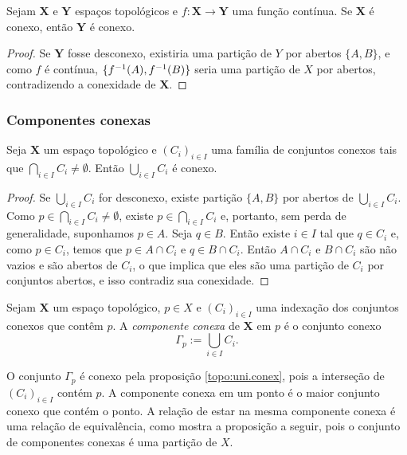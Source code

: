 \begin{proposition}
Sejam $\bm X$ e $\bm Y$ espaços topológicos e $f: \bm X \to \bm Y$ uma função contínua. Se $\bm X$ é conexo, então $\bm Y$ é conexo.
\end{proposition}
\begin{proof}
Se $\bm Y$ fosse desconexo, existiria uma partição de $Y$ por abertos $\{A,B\}$, e como $f$ é contínua, $\{f^{-1}(A),f^{-1}(B)\}$ seria uma partição de $X$ por abertos, contradizendo a conexidade de $\bm X$.
\end{proof}

\subsubsection{Componentes conexas}

\begin{proposition}
\label{topo:uni.conex}
Seja $\bm X$ um espaço topológico e $(C_i)_{i \in I}$ uma família de conjuntos conexos tais que $\bigcap_{i \in I} C_i \neq \emptyset$. Então $\bigcup_{i \in I} C_i$ é conexo.
\end{proposition}
\begin{proof}
Se $\bigcup_{i \in I} C_i$ for desconexo, existe partição $\{A,B\}$ por abertos de $\bigcup_{i \in I} C_i$. Como $p \in \bigcap_{i \in I} C_i \neq \emptyset$, existe $p \in \bigcap_{i \in I} C_i$ e, portanto, sem perda de generalidade, suponhamos $p \in A$. Seja $q \in B$. Então existe $i \in I$ tal que $q \in C_i$ e, como $p \in C_i$, temos que $p \in A \cap C_i$ e $q \in B \cap C_i$. Então $A \cap C_i$ e $B \cap C_i$ são não vazios e são abertos de $C_i$, o que implica que eles são uma partição de $C_i$ por conjuntos abertos, e isso contradiz sua conexidade.
\end{proof}

\begin{definition}
Sejam $\bm X$ um espaço topológico, $p \in X$ e $(C_i)_{i \in I}$ uma indexação dos conjuntos conexos que contêm $p$. A \emph{componente conexa} de $\bm X$ em $p$ é o conjunto conexo
	\begin{equation*}
	\Gamma_p := \bigcup_{i \in I} C_i.
	\end{equation*}
\end{definition}

O conjunto $\Gamma_p$ é conexo pela proposição \ref{topo:uni.conex}, pois a interseção de $(C_i)_{i \in I}$ contém $p$. A componente conexa em um ponto é o maior conjunto conexo que contém o ponto. A relação de estar na mesma componente conexa é uma relação de equivalência, como mostra a proposição a seguir, pois o conjunto de componentes conexas é uma partição de $X$.

